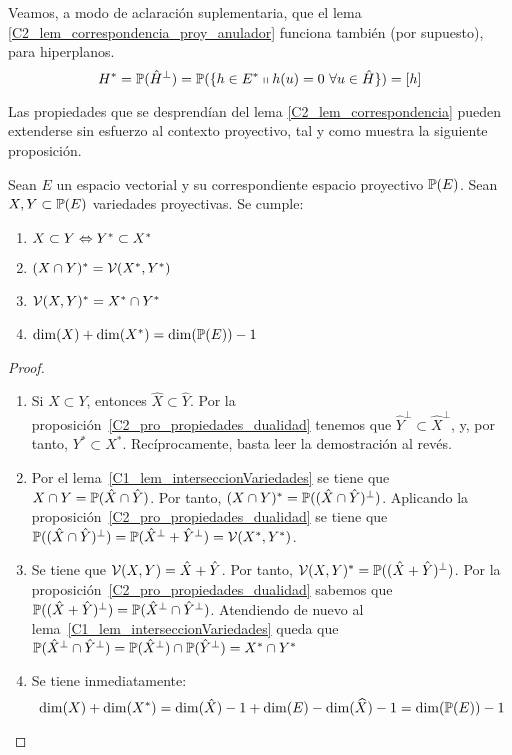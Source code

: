 \begin{obs}
	Veamos, a modo de aclaración suplementaria, que el lema \ref{C2_lem_correspondencia_proy_anulador} funciona también (por supuesto), para hiperplanos.
	\begin{equation*}
	H^*=\mathbb{P}(\hat{H}^{\perp})=\mathbb{P}(\{h\in E^*\shortparallel h(u)=0\ \forall u\in \hat{H}\})=[h]
	\end{equation*}
\end{obs}
Las propiedades que se desprendían del lema \ref{C2_lem_correspondencia} pueden extenderse sin esfuerzo al contexto proyectivo, tal y como muestra la siguiente proposición.
\begin{prop}
	\label{C2_pro_propiedades_dualidad_proy}
	Sean $E$ un espacio vectorial y su correspondiente espacio proyectivo $\mathbb{P}(E)$. Sean $X,Y\subset\mathbb{P}(E)$ variedades proyectivas. Se cumple:
	\begin{enumerate}
		\item $X\subset Y\Leftrightarrow Y^*\subset X^*$
		
		\item $(X\cap Y)^*=\mathcal{V}(X^*,Y^*)$
		
		\item $\mathcal{V}(X,Y)^*=X^*\cap Y^*$
		
		\item $\dim(X)+\dim(X^*)=\dim(\mathbb{P}(E))-1$
	\end{enumerate}
\end{prop}
\begin{proof}
	\begin{enumerate}
		\item Si $X\subset Y$, entonces $\hat{X}\subset\hat{Y}$. Por la proposición~\ref{C2_pro_propiedades_dualidad} tenemos que $\hat{Y}^{\perp}\subset \hat{X}^{\perp}$, y, por tanto, $Y^*\subset X^*$. Recíprocamente, basta leer la demostración al revés.
		
		\item Por el lema~\ref{C1_lem_interseccionVariedades} se tiene que $X\cap Y=\mathbb{P}(\hat{X}\cap\hat{Y})$. Por tanto, $(X\cap Y)^*=\mathbb{P}((\hat{X}\cap\hat{Y})^{\perp})$. Aplicando la proposición~\ref{C2_pro_propiedades_dualidad} se tiene que $\mathbb{P}((\hat{X}\cap\hat{Y})^{\perp})=\mathbb{P}(\hat{X}^{\perp}+\hat{Y}^{\perp})=\mathcal{V}(X^*,Y^*)$.
		
		\item Se tiene que $\mathcal{V}(X,Y)=\hat{X}+\hat{Y}$. Por tanto, $\mathcal{V}(X,Y)^*=\mathbb{P}((\hat{X}+\hat{Y})^{\perp})$. Por la proposición~\ref{C2_pro_propiedades_dualidad} sabemos que $\mathbb{P}((\hat{X}+\hat{Y})^{\perp})=\mathbb{P}(\hat{X}^{\perp}\cap\hat{Y}^{\perp})$. Atendiendo de nuevo al lema~\ref{C1_lem_interseccionVariedades} queda que $\mathbb{P}(\hat{X}^{\perp}\cap\hat{Y}^{\perp})=\mathbb{P}(\hat{X}^{\perp})\cap\mathbb{P}(\hat{Y}^{\perp})=X^*\cap Y^*$
		
		\item Se tiene inmediatamente:
		\begin{equation*}
		\dim(X)+\dim(X^*)=\dim(\hat{X})-1+\dim(E)-\dim(\widehat{X})-1=\dim(\mathbb{P}(E))-1
		\end{equation*}
	\end{enumerate}
\end{proof}
